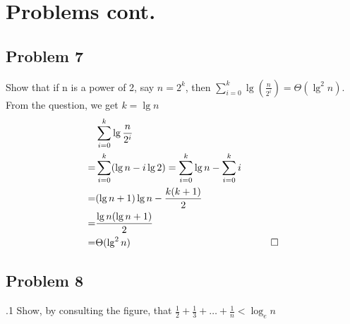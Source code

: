 \documentclass[handout]{beamer}
\begin{document}
\section{Problems cont.}

    \subsection{Problem 7}
    
        \begin{frame}[c]{\subsecname}
            Show that if n is a power of 2, say $n=2^k$, then $\sum^k_{i=0}\lg(\frac{n}{2^i})=\Theta(\lg^2{n})$.\\\pause
            From the question, we get $k=\lg{n}$
            \begin{align*}
            &\sum_{i=0}^{k}\lg{\frac{n}{2^i}}\\
            =&\sum_{i=0}^{k}(\lg{n}-i\lg{2})=\sum_{i=0}^{k}\lg{n}-\sum_{i=0}^{k}i\\
            =&(\lg{n}+1)\lg{n}-\frac{k(k+1)}{2}\\
            =&\frac{\lg{n}(\lg{n}+1)}{2}\\
            =&\Theta(\lg^2{n}) &\qed
            \end{align*}
        \end{frame}



    \subsection{Problem 8}
    
        \begin{frame}[c]{\subsecname.1}
            Show, by consulting the figure, that $\frac{1}{2}+\frac{1}{3}+\ldots+\frac{1}{n}<\log_e{n}$\\
        \end{frame}
    
\end{document}
